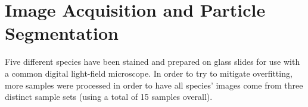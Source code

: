 \section{Image Acquisition and Particle Segmentation}

Five different species have been stained and prepared on glass slides for use with a common digital light-field microscope. In order to try to mitigate overfitting, more samples were processed in order to have all species’ images come from three distinct sample sets (using a total of 15 samples overall).
  
  
  